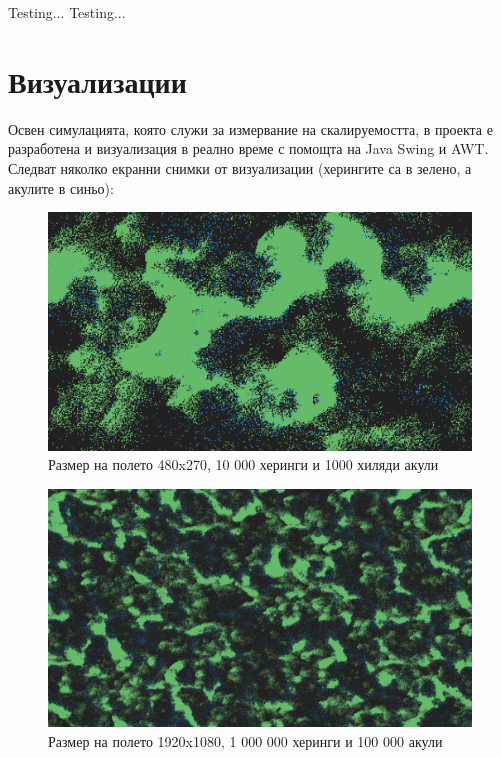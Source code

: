 \documentclass{article}
\begin{document}

\newpage
Testing...
\newpage
Testing...
\newpage


\section{Визуализации}
Освен симулацията, която служи за измервание на скалируемостта,
в проекта е разработена и визуализация в реално време с помощта на Java Swing и AWT.
Следват няколко екранни снимки от визуализации (херингите са в зелено, а акулите в синьо):

\begin{figure}[H]
	\centering
	\includegraphics[width=1\textwidth]{screenshot-small.png}
	\caption{Размер на полето 480x270, 10 000 херинги и 1000 хиляди акули}
\end{figure}

\begin{figure}[H]
	\centering
	\includegraphics[width=1\textwidth]{screenshot-big.png}
	\caption{Размер на полето 1920x1080, 1 000 000 херинги и 100 000 акули}
\end{figure}
\end{document}
